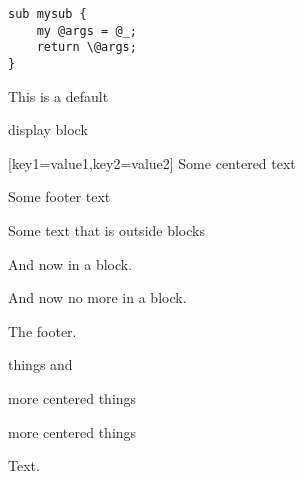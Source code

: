 \begin{verbatim}
sub mysub {
    my @args = @_;
    return \@args;
}
\end{verbatim}
This is a default

display block

\begin{center}[key1=value1,key2=value2]
Some centered text
\end{center}
\begin{footer}[key1=value\&1]
Some footer text
\end{footer}

Some text that is outside blocks

And now in a block.

And now no more in a block.
\begin{center}
The footer.
\end{center}
things and
\begin{center}
more centered things
\end{center}
\begin{center}
more centered things
\end{center}
Text.

